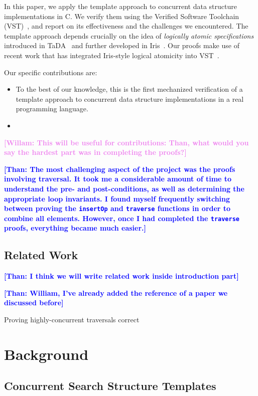 \documentclass[a4paper,UKenglish,cleveref, autoref, thm-restate]{lipics-v2021}
\newcommand{\than}[1]{\textbf{\textcolor{blue}{[Than: #1]}}}
\newcommand{\wm}[1]{\textbf{\textcolor{violet}{[Willam: #1]}}}
\begin{document}
In this paper, we apply the template approach to concurrent data structure implementations in C. We verify them using the Verified Software Toolchain (VST)~\cite{plfcc}, and report on its effectiveness and the challenges we encountered. The template approach depends crucially on the idea of \emph{logically atomic specifications} introduced in TaDA~\cite{tada} and further developed in Iris~\cite{iris}. Our proofs make use of recent work that has integrated Iris-style logical atomicity into VST~\cite{iris-vst-arxiv}.

Our specific contributions are:
\begin{itemize}
\item To the best of our knowledge, this is the first mechanized verification of a template approach to concurrent data structure implementations in a real programming language.
\item 
\end{itemize}
\wm{This will be useful for contributions: Than, what would you say the hardest part was in completing the proofs?}

\than{The most challenging aspect of the project was the proofs involving traversal. It took me a considerable amount of time to understand the pre- and post-conditions, as well as determining the appropriate loop invariants. I found myself frequently switching between proving the \texttt{insertOp} and \texttt{traverse} functions in order to combine all elements. However, once I had completed the \texttt{traverse} proofs, everything became much easier.} 

\subsection*{Related Work}
\than{I think we will write related work inside introduction part}

\than{William, I've already added the reference of a paper we discussed before}

Proving highly-concurrent traversals correct \cite{feldman2020proving}

\section{Background}
\subsection{Concurrent Search Structure Templates}
\end{document}
